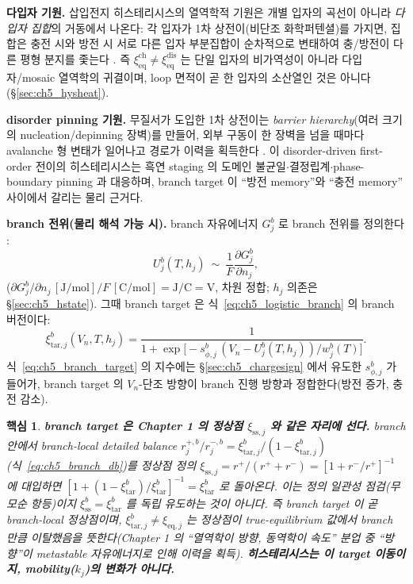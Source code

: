 \documentclass[11pt,a4paper]{article}
\newtheorem*{keybox}{핵심}
\newcommand{\eq}{\mathrm{eq}}
\newcommand{\sstat}{\mathrm{ss}}
\newcommand{\dis}{\mathrm{dis}}
\newcommand{\chg}{\mathrm{ch}}
\newcommand{\tar}{\mathrm{tar}}
\begin{document}
\textbf{다입자 기원.} 삽입전지 히스테리시스의 열역학적 기원은 개별 입자의 곡선이 아니라 \emph{다입자 집합}의
거동에서 나온다: 각 입자가 1차 상전이(비단조 화학퍼텐셜)를 가지면, 집합은 충전 시와 방전 시 서로 다른 입자
부분집합이 순차적으로 변태하여 충/방전이 다른 평형 분지를 좇는다 \cite{dreyer2010}. 즉 $\xi_{\eq}^{\chg}\ne
\xi_{\eq}^{\dis}$ 는 단일 입자의 비가역성이 아니라 다입자/mosaic 열역학의 귀결이며, loop 면적이 곧 한 입자의
소산열인 것은 아니다(\S\ref{sec:ch5_hysheat}).

\textbf{disorder pinning 기원.} 무질서가 도입한 1차 상전이는 \emph{barrier hierarchy}(여러 크기의
nucleation/depinning 장벽)를 만들어, 외부 구동이 한 장벽을 넘을 때마다 avalanche 형 변태가 일어나고 경로가
이력을 획득한다 \cite{sethna1993}. 이 disorder-driven first-order 전이의 히스테리시스는 흑연 staging 의 도메인
불균일$\cdot$결정립계$\cdot$phase-boundary pinning 과 대응하며, branch target 이 ``방전 memory''와 ``충전
memory'' 사이에서 갈리는 물리 근거다.

\textbf{branch 전위(물리 해석 가능 시).} branch 자유에너지 $G_j^b$ 로 branch 전위를 정의한다 \cite{dreyer2010,sethna1993}:
\begin{equation}
U_j^b(T,h_j)\ \sim\ \frac{1}{F}\frac{\partial G_j^b}{\partial n_j},
\label{eq:ch5_branch_potential}
\end{equation}
($\partial G_j^b/\partial n_j\,[\mathrm{J/mol}]/F\,[\mathrm{C/mol}]=\mathrm{J/C}=\mathrm V$, 차원 정합; $h_j$
의존은 \S\ref{sec:ch5_hstate}). 그때 branch target 은 식~\eqref{eq:ch5_logistic_branch} 의 branch 버전이다:
\begin{equation}
\xi_{\tar,j}^b(V_n,T,h_j)=\frac{1}{1+\exp\!\big[-s_{\phi,j}^b\,(V_n-U_j^b(T,h_j))/w_j^b(T)\big]}.
\label{eq:ch5_branch_target}
\end{equation}
식~\eqref{eq:ch5_branch_target} 의 지수에는 \S\ref{sec:ch5_chargesign} 에서 유도한 $s_{\phi,j}^b$ 가 들어가,
branch target 의 $V_n$-단조 방향이 branch 진행 방향과 정합한다(방전 증가, 충전 감소).

\begin{keybox}
\textbf{branch target 은 Chapter 1 의 정상점 $\xi_{\sstat,j}$ 와 같은 자리에 선다.} branch 안에서 branch-local
detailed balance $r_j^{+,b}/r_j^{-,b}=\xi_{\tar,j}^b/(1-\xi_{\tar,j}^b)$(식~\eqref{eq:ch5_branch_db})를 정상점
정의 $\xi_{\sstat,j}=r^+/(r^++r^-)=[1+r^-/r^+]^{-1}$ 에 대입하면 $[1+(1-\xi_\tar^b)/\xi_\tar^b]^{-1}=\xi_\tar^b$
로 돌아온다. 이는 \emph{정의 일관성 점검}(무모순 항등)이지 $\xi_{\sstat}^b=\xi_\tar^b$ 를 독립 유도하는 것이
아니다. 즉 \emph{branch target 이 곧 branch-local 정상점}이며, $\xi_{\tar,j}^b\ne\xi_{\eq,j}$ 는 정상점이
true-equilibrium 값에서 branch 만큼 \emph{이탈}했음을 뜻한다(Chapter 1 의 ``열역학이 방향, 동역학이 속도'' 분업
중 ``방향''이 metastable 자유에너지로 인해 이력을 획득). \textbf{히스테리시스는 이 target 이동이지,
mobility($k_j$)의 변화가 아니다.}
\end{keybox}
\end{document}
